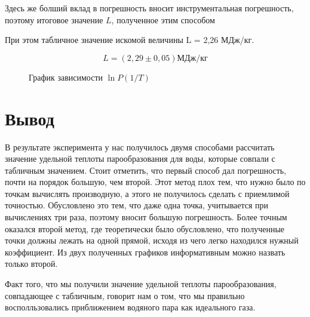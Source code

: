 \documentclass[a4paper,12pt]{article}
\begin{document}
Здесь же болший вклад в погрешность вносит инструментальная погрешность, поэтому итоговое значение $L$, полученное этим способом 


При этом табличное значение искомой величины L = 2,26 МДж/кг. 

$$
L =( 2,29 \pm 0,05) МДж/кг 
$$


\begin{figure}[h!]	\label{plan1}
	
	\caption{График зависимости $\ln P (1/T)$}
	
\end{figure}




	
\newpage

\section*{Вывод}


В результате эксперимента у нас получилось двумя способами рассчитать значение удельной теплоты парообразования для воды, которые совпали с табличным значением. Стоит отметить, что первый способ дал погрешность, почти на порядок большую, чем второй. Этот метод плох тем, что нужно было по точкам вычислять производную, а этого не получилось сделать с приемлимой точностью. Обусловлено это тем, что даже одна точка, учитывается при вычислениях три раза, поэтому вносит большую погрешность. Более точным оказался второй метод, где теоретически было обусловлено, что полученные точки должны лежать на одной прямой, исходя из чего легко находился нужный коэффициент. Из двух полученных графиков информативным можно назвать только второй. 

Факт того, что мы получили значение удельной теплоты парообразования, совпадающее с табличным, говорит нам о том, что мы правильно восполльзовались приближением водяного пара как идеального газа. 
\end{document}
